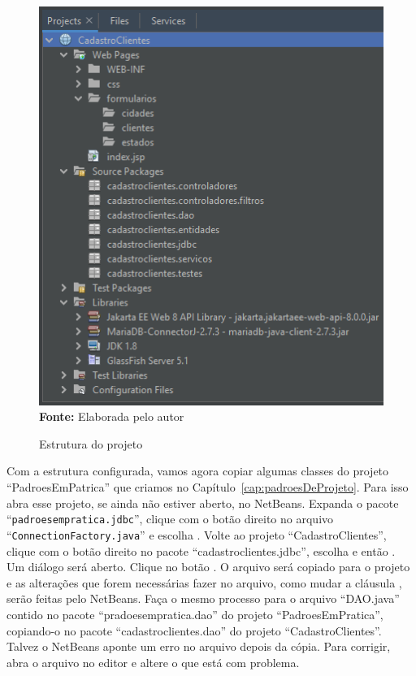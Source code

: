 \FloatBarrier
\begin{figure}[!htbp]
    \centering
    \caption{Estrutura do projeto}
    \includegraphics[scale=0.7]{imagens/cap05EstruturaProjeto}
    \\\textbf{Fonte:} Elaborada pelo autor
    \label{fig:cap05EstruturaProjeto}
\end{figure}
\FloatBarrier

Com a estrutura configurada, vamos agora copiar algumas classes do projeto ``PadroesEmPatrica'' que criamos no Capítulo~\ref{cap:padroesDeProjeto}. Para isso abra esse projeto, se ainda não estiver aberto, no NetBeans. Expanda o pacote ``\texttt{padroesempratica.jdbc}'', clique com o botão direito no arquivo ``\texttt{ConnectionFactory.java}'' e escolha . Volte ao projeto ``CadastroClientes'', clique com o botão direito no pacote ``cadastroclientes.jdbc'', escolha  e então . Um diálogo será aberto. Clique no botão . O arquivo será copiado para o projeto e as alterações que forem necessárias fazer no arquivo, como mudar a cláusula , serão feitas pelo NetBeans. Faça o mesmo processo para o arquivo ``DAO.java'' contido no pacote ``pradoesempratica.dao'' do projeto ``PadroesEmPratica'', copiando-o no pacote ``cadastroclientes.dao'' do projeto ``CadastroClientes''. Talvez o NetBeans aponte um erro no arquivo depois da cópia. Para corrigir, abra o arquivo no editor e altere o  que está com problema. 

